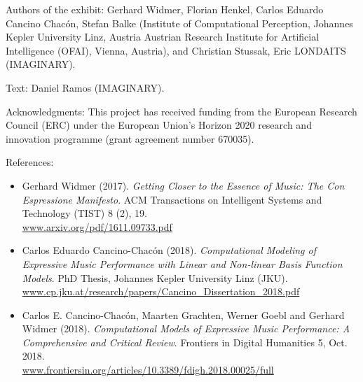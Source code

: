 \begin{sectcredits}

\item[Authors of the exhibit:] Gerhard Widmer, Florian Henkel, Carlos Eduardo Cancino Chacón, Stefan Balke (Institute of Computational Perception, Johannes Kepler University Linz, Austria
Austrian Research Institute for Artificial Intelligence (OFAI), Vienna, Austria), and Christian Stussak, Eric LONDAITS (IMAGINARY).

\item[Text:] Daniel Ramos (IMAGINARY).

\item[Acknowledgments:] This project has received funding from the European Research Council (ERC) under the European Union's Horizon 2020 research and innovation programme (grant agreement number 670035).

\item[References:] \strut
\noindent \begin{itemize}[leftmargin=*]
\item Gerhard Widmer (2017). \emph{Getting Closer to the Essence of Music: The Con Espressione Manifesto}. ACM Transactions on Intelligent Systems and Technology (TIST) 8 (2), 19. \\
\url{www.arxiv.org/pdf/1611.09733.pdf}

\item Carlos Eduardo Cancino-Chacón (2018). \emph{Computational Modeling of Expressive Music Performance with Linear and Non-linear Basis Function Models}. PhD Thesis, Johannes Kepler University Linz (JKU).\\
\url{www.cp.jku.at/research/papers/Cancino_Dissertation_2018.pdf}

\item Carlos E. Cancino-Chacón, Maarten Grachten, Werner Goebl and Gerhard Widmer (2018). \emph{Computational Models of Expressive Music Performance: A Comprehensive and Critical Review}. Frontiers in Digital Humanities 5, Oct. 2018. \\
\url{www.frontiersin.org/articles/10.3389/fdigh.2018.00025/full}
\end{itemize}
\end{sectcredits}
